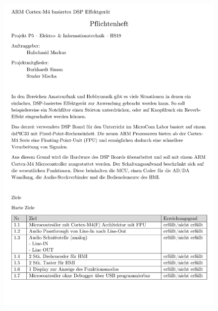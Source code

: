 \begin{appendix}
\begin{figure}[h!]
	\centering
	\includegraphics[width=0.95\linewidth]{appendix/pflichtenheft (1).pdf}
\end{figure}


\end{appendix}
